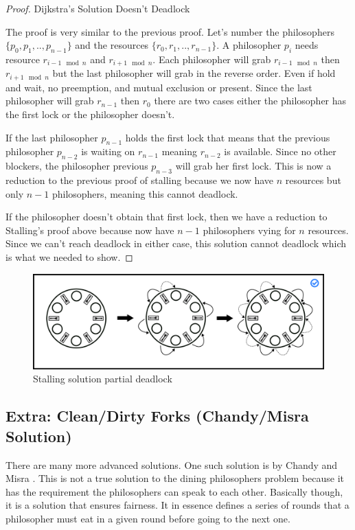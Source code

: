 \begin{proof} Dijkstra's Solution Doesn't Deadlock

The proof is very similar to the previous proof.
Let's number the philosophers $\{p_0, p_1, .., p_{n-1}\}$ and the resources $\{r_0, r_1, .., r_{n-1}\}$.
A philosopher $p_i$ needs resource $r_{i-1 \mod n}$ and $r_{i + 1 \mod n}$.
Each philosopher will grab $r_{i-1 \mod n}$ then $r_{i + 1 \mod n}$ but the last philosopher will grab in the reverse order.
Even if hold and wait, no preemption, and mutual exclusion or present.
Since the last philosopher will grab $r_{n-1}$ then $r_0$ there are two cases either the philosopher has the first lock or the philosopher doesn't.

If the last philosopher $p_{n-1}$ holds the first lock that means that the previous philosopher $p_{n-2}$ is waiting on $r_{n-1}$ meaning $r_{n-2}$ is available.
Since no other blockers, the philosopher previous $p_{n-3}$ will grab her first lock.
This is now a reduction to the previous proof of stalling because we now have $n$ resources but only $n-1$ philosophers, meaning this cannot deadlock.

If the philosopher doesn't obtain that first lock, then we have a reduction to Stalling's proof above because now have $n-1$ philosophers vying for $n$ resources.
Since we can't reach deadlock in either case, this solution cannot deadlock which is what we needed to show.

\end{proof}

\begin{figure}[H]
\centering
\includegraphics[width=.9\textwidth]{deadlock/drawings/dining_partial.eps}
\caption{Stalling solution partial deadlock}
\end{figure}

\subsection{Extra: Clean/Dirty Forks (Chandy/Misra Solution)}

There are many more advanced solutions.
One such solution is by Chandy and Misra \cite{Chandy:1984:DPP:1780.1804}.
This is not a true solution to the dining philosophers problem because it has the requirement the philosophers can speak to each other.
Basically though, it is a solution that ensures fairness.
It in essence defines a series of rounds that a philosopher must eat in a given round before going to the next one.

